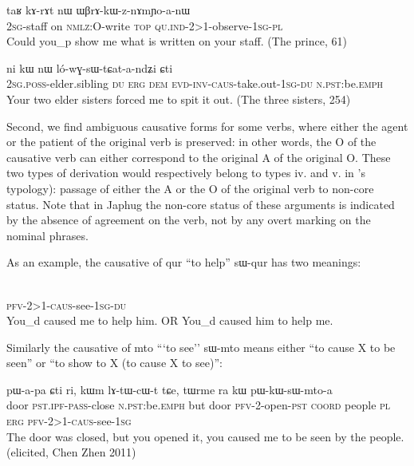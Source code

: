 \documentclass[oldfontcommands,oneside,a4paper,11pt]{memoir}
\newcommand{\ipa}[1]{{\phon #1}} %
\newcommand{\wav}[1]{}%
\newcommand{\caus}{\textsc{caus}}
\newcommand{\coord}{\textsc{coord}}
\newcommand{\dem}{\textsc{dem}}
\newcommand{\du}{\textsc{du}}
\newcommand{\erg}{\textsc{erg}}
\newcommand{\emphat}{\textsc{emph}}
\newcommand{\evd}{\textsc{evd}}
\newcommand{\inv}{\textsc{inv}}
\newcommand{\ipf}{\textsc{ipf}}
\newcommand{\nmlz}{\textsc{nmlz}}
\newcommand{\npst}{\textsc{n.pst}}
\newcommand{\pfv}{\textsc{pfv}}
\newcommand{\pl}{\textsc{pl}}
\newcommand{\pass}{\textsc{pass}}
\newcommand{\poss}{\textsc{poss}}
\newcommand{\pst}{\textsc{pst}}
\newcommand{\sg}{\textsc{sg}}
\newcommand{\topic}{\textsc{top}}
\newcommand{\quind}{\textsc{qu.ind}} %
\begin{document}
 \begin{exe}
\ex
\gll  \ipa{nɤ-tɤɲi} 	\ipa{taʁ} 	\ipa{kɤ-rɤt} 	\ipa{nɯ} 	\ipa{ɯβrɤ-kɯ-z-nɤmɲo-a-nɯ} \\
  2\sg{}-staff on \nmlz{}:O-write \topic{} \quind{}-2>1-observe-1\sg{}-\pl{} \\
  \glt Could you_p show me what is written on your staff. (The prince, 61)
\end{exe} 

 \begin{exe}
\ex
\gll \ipa{nɤ-pi} 	\ipa{ni} 	\ipa{kɯ} 	\ipa{nɯ} 	\ipa{ló-wɣ-sɯ-tɕat-a-ndʑi} 	\ipa{ɕti}  \\
2\sg{}.\poss{}-elder.sibling \du{} \erg{} \dem{} \evd{}-\inv{}-\caus{}-take.out-1\sg{}-\du{} \npst{}:be.\emphat{} \\
  \glt Your two elder sisters forced me to spit it out. (The three sisters, 254)
\end{exe} 

Second, we find ambiguous causative forms for some verbs, where either the agent or the patient of the original verb is preserved: in other words, the O of the causative verb can either correspond to the original A of the original O. These two types of derivation would respectively belong to types iv. and v. in \citet[48]{dixon00causative}'s typology): passage of either the A or the O of the original verb to non-core status. Note that in Japhug the non-core status of these arguments is indicated by the absence of agreement on the verb, not by any overt marking on the nominal phrases. 
 
As an example, the causative of \ipa{qur} ``to help''  \ipa{sɯ-qur} has two meanings:

\begin{exe} 
\ex \label{ex:caus:show.2>3>1}
\gll   \ipa{tɤ-kɯ-sɯ-qur-a-ndʑi}  \\
 \pfv{}-2>1-\caus{}-see-1\sg{}-\du{}  \\
 \glt  You_d caused me to help him. OR You_d caused him to help me. \wav{8_tAkWsWqura}
\end{exe} 

Similarly the causative of \ipa{mto} ```to see'' \ipa{sɯ-mto} means either ``to cause X to be seen'' or ``to show to X (to cause X to see)'':

\begin{exe} 
\ex \label{ex:caus:show.2>3>1}
\gll  \ipa{kɯm} 	\ipa{pɯ-a-pa} 	\ipa{ɕti} 	\ipa{ri,} 	\ipa{kɯm} 	\ipa{lɤ-tɯ-cɯ-t} 	\ipa{tɕe,} 	\ipa{tɯrme} 	\ipa{ra} 	\ipa{kɯ} 	\ipa{pɯ-kɯ-sɯ-mto-a}  \\
door \pst{}.\ipf{}-\pass{}-close \npst{}:be.\emphat{} but door \pfv{}-2-open-\pst{} \coord{} people \pl{} \erg{}  \pfv{}-2>1-\caus{}-see-1\sg{}  \\
 \glt The door was closed, but you opened it, you caused me to be seen by the people. (elicited, Chen Zhen 2011) \wav{8_pWkWsWmtoa} 
\end{exe} 
\end{document}
